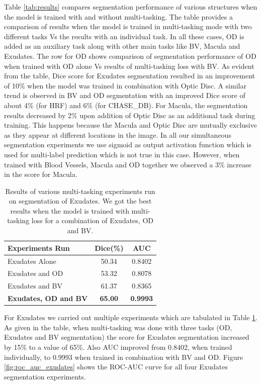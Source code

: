 \documentclass[utf8]{FrontiersinHarvard} %
\begin{document}
Table \ref{tab:results} compares segmentation performance of various structures when the model is trained with and without multi-tasking. The table provides a comparison of  results when  the model is trained in multi-tasking mode with two different tasks  Vs the results with an individual task. In all these cases, OD is added as an auxiliary task along with other main tasks like BV, Macula and Exudates. The row for OD shows comparison of segmentation performance of OD when trained with OD alone Vs results of multi-tasking loss with BV.  As evident from the table, Dice score for Exudates segmentation resulted in an improvement  of 10\% when the model was trained in combination with Optic Disc. A similar trend is observed in BV and OD segmentation with an improved Dice score of about 4\% (for HRF) and 6\% (for CHASE\_DB). For Macula, the segmentation results decreased by 2\% upon addition of Optic Disc as an additional task during training. This happens because the Macula and Optic Disc are mutually exclusive as they appear at different locations in the image. In all our simultaneous segmentation experiments we use sigmoid as output activation function which is used for multi-label prediction which is not true in this case. However, when trained with Blood Vessels, Macula and OD together we observed a 3\% increase in the score for Macula.

\begin{table}
\caption{Results of various multi-tasking experiments run on segmentation of Exudates. We got the best results when the model is trained with multi-tasking loss for a combination of Exudates, OD and BV.}
\begin{center}
\begin{tabular}{ |l|c|c|  }
\hline
\textbf{Experiments Run} & \textbf{Dice(\%)} & \textbf{AUC}\\
\hline
Exudates Alone & 50.34 & 0.8402 \\
\hline
Exudates and OD & 53.32 & 0.8078\\
\hline
Exudates and BV & 61.37 & 0.8365\\
\hline
\textbf{Exudates, OD and BV} & \textbf{65.00} & \textbf{0.9993} \\
\hline
\end{tabular}
\end{center}
\label{tab:exudates_improvement}
\end{table}

For Exudates we carried out multiple experiments which are  tabulated in Table \ref{tab:exudates_improvement}. As given in the table, when multi-tasking was done with three tasks (OD, Exudates and BV segmentation) the score for Exudates segmentation  increased by 15\% to a value of 65\%. Also AUC improved from 0.8402, when trained individually, to 0.9993 when trained in combination with BV and OD. Figure \ref{fig:roc_auc_exudates} shows the ROC-AUC curve for all four Exudates segmentation experiments.
\end{document}
